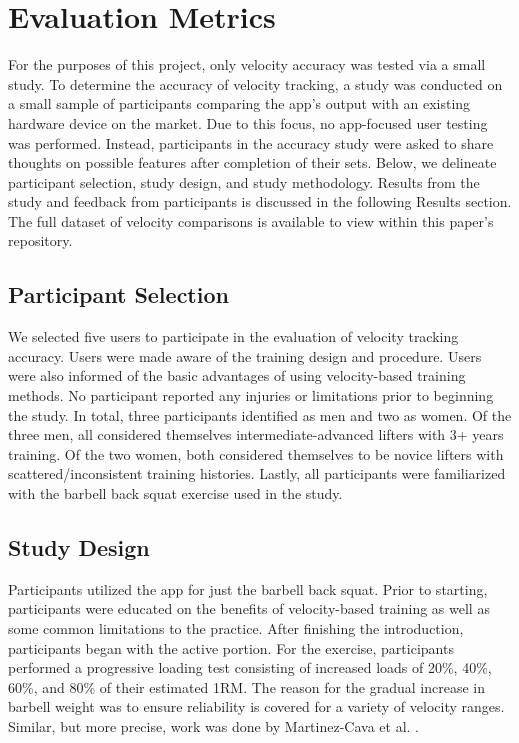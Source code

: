 \documentclass[10pt,twocolumn]{article}
\begin{document}
\section{Evaluation Metrics}
For the purposes of this project, only velocity accuracy was tested via a small study. 
To determine the accuracy of velocity tracking, a study was conducted on a small sample of participants comparing the app's output with an existing hardware device on the market.
Due to this focus, no app-focused user testing was performed.
Instead, participants in the accuracy study were asked to share thoughts on possible features after completion of their sets.
Below, we delineate participant selection, study design, and study methodology.
Results from the study and feedback from participants is discussed in the following Results section. 
The full dataset of velocity comparisons is available to view within this paper's repository.\par

\subsection{Participant Selection}
We selected five users to participate in the evaluation of velocity tracking accuracy.
Users were made aware of the training design and procedure.
Users were also informed of the basic advantages of using velocity-based training methods.
No participant reported any injuries or limitations prior to beginning the study.
In total, three participants identified as men and two as women.
Of the three men, all considered themselves intermediate-advanced lifters with 3+ years training.
Of the two women, both considered themselves to be novice lifters with scattered/inconsistent training histories.
Lastly, all participants were familiarized with the barbell back squat exercise used in the study. \par

\subsection{Study Design}
Participants utilized the app for just the barbell back squat.
Prior to starting, participants were educated on the benefits of velocity-based training as well as some common limitations to the practice.
After finishing the introduction, participants began with the active portion.
For the exercise, participants performed a progressive loading test consisting of increased loads of 20\%, 40\%, 60\%, and 80\% of their estimated 1RM.
The reason for the gradual increase in barbell weight was to ensure reliability is covered for a variety of velocity ranges.
Similar, but more precise, work was done by Martinez-Cava et al. \cite{Martinez-Cava2020}. \par
\end{document}
